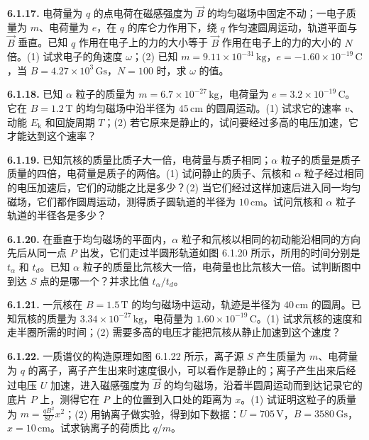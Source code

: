 \vfill
\newpage

\textbf{6.1.17.} 电荷量为 $q$ 的点电荷在磁感强度为 $\vec{B}$ 的均匀磁场中固定不动；一电子质量为 $m$、电荷量为 $e$，在 $q$ 的库仑力作用下，绕 $q$ 作匀速圆周运动，轨道平面与 $\vec{B}$ 垂直。已知 $q$ 作用在电子上的力的大小等于 $\vec{B}$ 作用在电子上的力的大小的 $N$ 倍。(1) 试求电子的角速度 $\omega$；(2) 已知 $m = 9.11 \times 10^{-31}\,\mathrm{kg}$，$e = -1.60 \times 10^{-19}\,\mathrm{C}$，当 $B = 4.27 \times 10^{3}\,\mathrm{Gs}$，$N = 100$ 时，求 $\omega$ 的值。

\vfill
\newpage

\textbf{6.1.18.} 已知 $\alpha$ 粒子的质量为 $m = 6.7 \times 10^{-27}\,\mathrm{kg}$，电荷量为 $e = 3.2 \times 10^{-19}\,\mathrm{C}$。它在 $B = 1.2\,\mathrm{T}$ 的均匀磁场中沿半径为 $45\,\mathrm{cm}$ 的圆周运动。(1) 试求它的速率 $v$、动能 $E_{\mathrm{k}}$ 和回旋周期 $T$；(2) 若它原来是静止的，试问要经过多高的电压加速，它才能达到这个速率？

\vfill
\newpage

\textbf{6.1.19.} 已知氘核的质量比质子大一倍，电荷量与质子相同；$\alpha$ 粒子的质量是质子质量的四倍，电荷量是质子的两倍。(1) 试问静止的质子、氘核和 $\alpha$ 粒子经过相同的电压加速后，它们的动能之比是多少？(2) 当它们经过这样加速后进入同一均匀磁场，它们都作圆周运动，测得质子圆轨道的半径为 $10\,\mathrm{cm}$。试问氘核和 $\alpha$ 粒子轨道的半径各是多少？

\vfill
\newpage

\textbf{6.1.20.} 在垂直于均匀磁场的平面内，$\alpha$ 粒子和氘核以相同的初动能沿相同的方向先后从同一点 $P$ 出发，它们走过半圆形轨道如图 6.1.20 所示，所用的时间分别是 $t_{\alpha}$ 和 $t_{d}$。已知 $\alpha$ 粒子的质量比氘核大一倍，电荷量也比氘核大一倍。试判断图中到达 $S$ 点的是哪一个？并求比值 $t_{\alpha} / t_{d}$。

\begin{center}
\end{center}

\vfill
\newpage

\textbf{6.1.21.} 一氘核在 $B = 1.5\,\mathrm{T}$ 的均匀磁场中运动，轨迹是半径为 $40\,\mathrm{cm}$ 的圆周。已知氘核的质量为 $3.34 \times 10^{-27}\,\mathrm{kg}$，电荷量为 $1.60 \times 10^{-19}\,\mathrm{C}$。(1) 试求氘核的速度和走半圈所需的时间；(2) 需要多高的电压才能把氘核从静止加速到这个速度？

\vfill
\newpage

\textbf{6.1.22.} 一质谱仪的构造原理如图 6.1.22 所示，离子源 $S$ 产生质量为 $m$、电荷量为 $q$ 的离子，离子产生出来时速度很小，可以看作是静止的；离子产生出来后经过电压 $U$ 加速，进入磁感强度为 $\vec{B}$ 的均匀磁场，沿着半圆周运动而到达记录它的底片 $P$ 上，测得它在 $P$ 上的位置到入口处的距离为 $x$。(1) 试证明这粒子的质量为 $\displaystyle m = \frac{qB^{2}}{8U} x^{2}$；(2) 用钠离子做实验，得到如下数据：$U = 705\,\mathrm{V}$，$B = 3580\,\mathrm{Gs}$，$x = 10\,\mathrm{cm}$。试求钠离子的荷质比 $q / m$。

